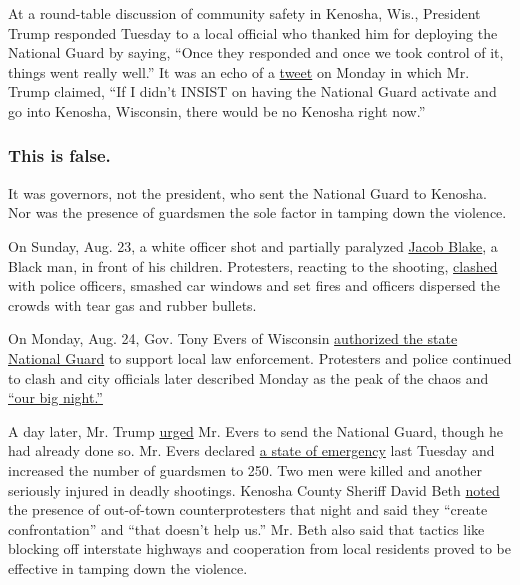 At a round-table discussion of community safety in Kenosha, Wis.,
President Trump responded Tuesday to a local official who thanked him
for deploying the National Guard by saying, ``Once they responded and
once we took control of it, things went really well.'' It was an echo of
a
\href{https://twitter.com/realDonaldTrump/status/1300420725837266944}{tweet}
on Monday in which Mr. Trump claimed, ``If I didn't INSIST on having the
National Guard activate and go into Kenosha, Wisconsin, there would be
no Kenosha right now.''

\hypertarget{this-is-false}{%
\subsubsection{\texorpdfstring{\textbf{This is
false.}}{This is false.}}\label{this-is-false}}

It was governors, not the president, who sent the National Guard to
Kenosha. Nor was the presence of guardsmen the sole factor in tamping
down the violence.

On Sunday, Aug. 23, a white officer shot and partially paralyzed
\href{https://slack-redir.net/link?url=https\%3A\%2F\%2Fwww.nytimes3xbfgragh.onion\%2F2020\%2F08\%2F24\%2Fus\%2Fkenosha-police-shooting.html}{Jacob
Blake}, a Black man, in front of his children. Protesters, reacting to
the shooting,
\href{https://slack-redir.net/link?url=https\%3A\%2F\%2Fwww.nytimes3xbfgragh.onion\%2F2020\%2F08\%2F25\%2Fus\%2Fjacob-blake-kenosha-fires.html}{clashed}
with police officers, smashed car windows and set fires and officers
dispersed the crowds with tear gas and rubber bullets.

On Monday, Aug. 24, Gov. Tony Evers of Wisconsin
\href{https://slack-redir.net/link?url=https\%3A\%2F\%2Fcontent.govdelivery.com\%2Faccounts\%2FWIGOV\%2Fbulletins\%2F29b954d}{authorized
the state National Guard} to support local law enforcement. Protesters
and police continued to clash and city officials later described Monday
as the peak of the chaos and
\href{https://slack-redir.net/link?url=https\%3A\%2F\%2Fwww.rev.com\%2Fblog\%2Ftranscripts\%2Fkenosha-officials-press-conference-transcript-august-27-police-shooting-of-jacob-blake-update}{``our
big night.''}

A day later, Mr. Trump
\href{https://twitter.com/realDonaldTrump/status/1298414089769750530}{urged}
Mr. Evers to send the National Guard, though he had already done so. Mr.
Evers declared
\href{https://slack-redir.net/link?url=https\%3A\%2F\%2Fdma.wi.gov\%2FDMA\%2Fwemnews\%2F2020wemnews\%2Fready200825}{a
state of emergency} last Tuesday and increased the number of guardsmen
to 250. Two men were killed and another seriously injured in deadly
shootings. Kenosha County Sheriff David Beth
\href{https://slack-redir.net/link?url=https\%3A\%2F\%2Fwww.rev.com\%2Fblog\%2Ftranscripts\%2Fkenosha-wi-officials-press-conference-transcript-august-26-protest-shooting}{noted}
the presence of out-of-town counterprotesters that night and said they
``create confrontation'' and ``that doesn't help us.'' Mr. Beth also
said that tactics like blocking off interstate highways and cooperation
from local residents proved to be effective in tamping down the
violence.

